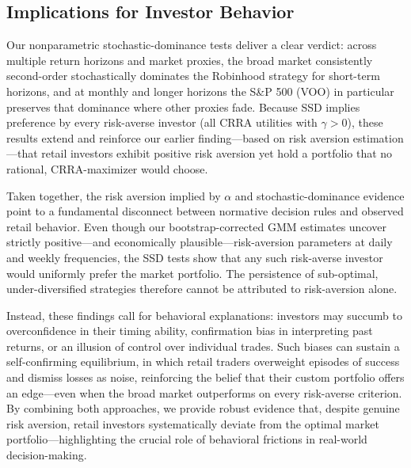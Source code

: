\subsection{Implications for Investor Behavior}

Our nonparametric stochastic-dominance tests deliver a clear verdict: across multiple return horizons and market proxies, the broad market consistently second-order stochastically dominates the Robinhood strategy for short-term horizons, and at monthly and longer horizons the S\&P 500 (VOO) in particular preserves that dominance where other proxies fade.  
Because SSD implies preference by every risk-averse investor (all CRRA utilities with $\gamma>0$), these results extend and reinforce our earlier finding—based on risk aversion estimation—that retail investors exhibit positive risk aversion yet hold a portfolio that no rational, CRRA-maximizer would choose.  

Taken together, the risk aversion implied by $\alpha$ and stochastic-dominance evidence point to a fundamental disconnect between normative decision rules and observed retail behavior.  
Even though our bootstrap-corrected GMM estimates uncover strictly positive—and economically plausible—risk-aversion parameters at daily and weekly frequencies, 
the SSD tests show that any such risk-averse investor would uniformly prefer the market portfolio.  
The persistence of sub-optimal, under-diversified strategies therefore cannot be attributed to risk-aversion alone.

Instead, these findings call for behavioral explanations: investors may succumb to overconfidence in their timing ability, confirmation bias in interpreting past returns, or an illusion of control over individual trades.  
Such biases can sustain a self-confirming equilibrium, in which retail traders overweight episodes of success and dismiss losses as noise, reinforcing the belief that their custom portfolio offers an edge—even when the broad market outperforms on every risk-averse criterion.
By combining both approaches, we provide robust evidence that, despite genuine risk aversion, retail investors systematically deviate from the optimal market portfolio—highlighting the crucial role of behavioral frictions in real-world decision-making.  
